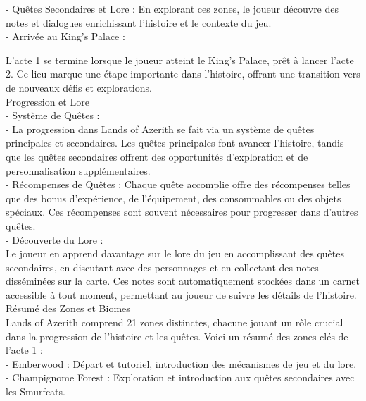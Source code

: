 - Quêtes Secondaires et Lore : En explorant ces zones, le joueur découvre des notes et dialogues enrichissant l'histoire et le contexte du jeu.
\\

- Arrivée au King's Palace :

L'acte 1 se termine lorsque le joueur atteint le King's Palace, prêt à lancer l'acte 2. Ce lieu marque une étape importante dans l'histoire, offrant une transition vers de nouveaux défis et explorations.
\\

Progression et Lore
\\

- Système de Quêtes :
\\

- La progression dans Lands of Azerith se fait via un système de quêtes principales et secondaires. Les quêtes principales font avancer l'histoire, tandis que les quêtes secondaires offrent des opportunités d'exploration et de personnalisation supplémentaires.
\\

- Récompenses de Quêtes : Chaque quête accomplie offre des récompenses telles que des bonus d'expérience, de l'équipement, des consommables ou des objets spéciaux. Ces récompenses sont souvent nécessaires pour progresser dans d'autres quêtes.
\\

- Découverte du Lore :
\\

Le joueur en apprend davantage sur le lore du jeu en accomplissant des quêtes secondaires, en discutant avec des personnages et en collectant des notes disséminées sur la carte. Ces notes sont automatiquement stockées dans un carnet accessible à tout moment, permettant au joueur de suivre les détails de l'histoire.
\\

Résumé des Zones et Biomes
\\

Lands of Azerith comprend 21 zones distinctes, chacune jouant un rôle crucial dans la progression de l'histoire et les quêtes. Voici un résumé des zones clés de l'acte 1 :
\\

- Emberwood : Départ et tutoriel, introduction des mécanismes de jeu et du lore.
\\

- Champignome Forest : Exploration et introduction aux quêtes secondaires avec les Smurfcats.
\\

